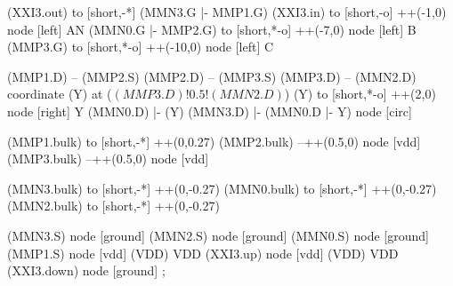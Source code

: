 \begin{circuitikz}[american]
	(XXI3.out) to [short,-*] (MMN3.G |- MMP1.G)
	(XXI3.in) to [short,-o] ++(-1,0) node [left] {AN}
	(MMN0.G |- MMP2.G) to [short,*-o] ++(-7,0) node [left] {B}
	(MMP3.G) to [short,*-o] ++(-10,0) node [left] {C}
	
	(MMP1.D) -- (MMP2.S)
	(MMP2.D) -- (MMP3.S)
	(MMP3.D) -- (MMN2.D)
	coordinate (Y) at ($(MMP3.D)!0.5!(MMN2.D)$)
	(Y) to [short,*-o] ++(2,0) node [right] {Y}
	(MMN0.D) |- (Y)
	(MMN3.D) |- (MMN0.D |- Y) node [circ] {}
	
	(MMP1.bulk) to [short,-*] ++(0,0.27)
	(MMP2.bulk) --++(0.5,0) node [vdd] {}
	(MMP3.bulk) --++(0.5,0) node [vdd] {}
	
	(MMN3.bulk) to [short,-*] ++(0,-0.27)
	(MMN0.bulk) to [short,-*] ++(0,-0.27)
	(MMN2.bulk) to [short,-*] ++(0,-0.27)	


	(MMN3.S) node [ground] {}
	(MMN2.S) node [ground] {}
	(MMN0.S) node [ground] {}
	(MMP1.S) node [vdd] (VDD) {VDD}
	(XXI3.up) node [vdd] (VDD) {VDD}
	(XXI3.down) node [ground] {}
;

\end{circuitikz}
